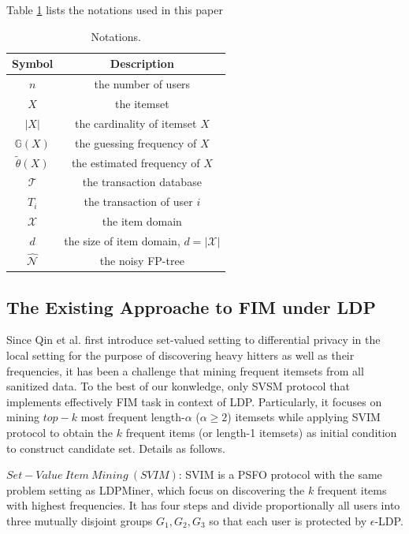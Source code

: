 \documentclass[conference]{IEEEtran}
\begin{document}
{\color{red}Table \ref{notations} lists the notations used in this paper}

\begin{table}[!t]
\caption{Notations.}
\begin{center}
\begin{tabular}{|c|c|}\hline
  Symbol&Description \\\hline
  $n$ & the number of users \\\hline
  $X$ & the itemset \\\hline
  $|X|$ & the cardinality of itemset $X$ \\\hline
  $\mathbb{G}(X)$ & the guessing frequency of $X$ \\\hline
  $\tilde{\theta}(X)$ & the estimated frequency of $X$ \\\hline
  $\mathcal{T}$ & the transaction database \\\hline
  $T_i$ & the transaction of user $i$ \\\hline
  $\mathcal{X}$ & the item domain \\\hline
  $d$ & the size of item domain, $d = |\mathcal{X}|$ \\\hline
  $\hat{\mathcal{N}}$ & the noisy FP-tree \\\hline

\end{tabular}
\label{notations}
\end{center}
\end{table}

\subsection{The Existing Approache to FIM under LDP}\label{svim and svsm}
Since Qin et al.\cite{a1} first introduce set-valued setting to differential privacy in the local setting for the purpose of discovering heavy hitters as well as their frequencies, it has been a challenge that mining frequent itemsets from all sanitized data. To the best of our konwledge, only SVSM\cite{a2} protocol that implements effectively FIM task in context of LDP. Particularly, it focuses on mining $top-k$ most frequent length-$\alpha$ ($\alpha\geq2$) itemsets while applying SVIM\cite{a2} protocol to obtain the $k$ frequent items (or length-1 itemsets) as initial condition to construct candidate set. Details as follows. 

$Set-Value\ Item\ Mining\ (SVIM)$: SVIM is a PSFO protocol with the same problem setting as LDPMiner\cite{a1}, which focus on discovering the $k$ frequent items with highest frequencies. It has four steps and divide proportionally all users into three mutually disjoint groups $G_1,G_2,G_3$ so that each user is protected by $\epsilon$-LDP.
\end{document}
